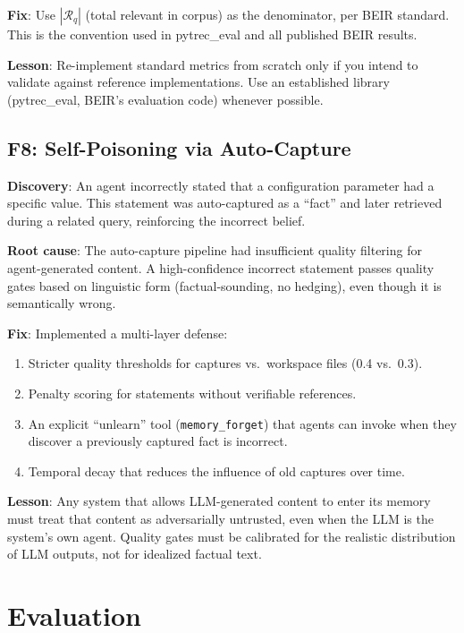 \documentclass[11pt]{article}
\begin{document}
\textbf{Fix}: Use $|\mathcal{R}_q|$ (total relevant in corpus) as the denominator, per
BEIR standard. This is the convention used in pytrec\_eval and all published BEIR results.

\textbf{Lesson}: Re-implement standard metrics from scratch only if you intend to
validate against reference implementations. Use an established library (pytrec\_eval,
BEIR's evaluation code) whenever possible.

\subsection{F8: Self-Poisoning via Auto-Capture}
\label{sec:failures:F8}

\textbf{Discovery}: An agent incorrectly stated that a configuration parameter had a
specific value. This statement was auto-captured as a ``fact'' and later retrieved
during a related query, reinforcing the incorrect belief.

\textbf{Root cause}: The auto-capture pipeline had insufficient quality filtering for
agent-generated content. A high-confidence incorrect statement passes quality gates
based on linguistic form (factual-sounding, no hedging), even though it is
semantically wrong.

\textbf{Fix}: Implemented a multi-layer defense:
\begin{enumerate}[leftmargin=2em, itemsep=2pt]
  \item Stricter quality thresholds for captures vs.\ workspace files (0.4 vs.\ 0.3).
  \item Penalty scoring for statements without verifiable references.
  \item An explicit ``unlearn'' tool (\texttt{memory\_forget}) that agents can invoke
  when they discover a previously captured fact is incorrect.
  \item Temporal decay that reduces the influence of old captures over time.
\end{enumerate}

\textbf{Lesson}: Any system that allows LLM-generated content to enter its memory must
treat that content as adversarially untrusted, even when the LLM is the system's own
agent. Quality gates must be calibrated for the realistic distribution of LLM outputs,
not for idealized factual text.

\section{Evaluation}
\label{sec:eval}
\end{document}
